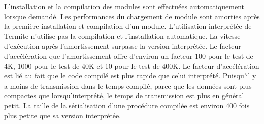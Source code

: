 L'installation et la compilation des modules sont effectuées automatiquement
lorsque demandé.  Les performances du chargement de module sont amorties après
la première installation et compilation d'un module. L'utilisation interprétée
de Termite n'utilise pas la compilation et l'installation automatique.  La
vitesse d'exécution après l'amortissement surpasse la version interprétée.  Le
facteur d'accélération que l'amortissement offre d'environ un facteur 100 pour
le test de 4K, 1000 pour le test de 40K et 10 pour le test de 400K.  Le facteur
d'accélération est lié au fait que le code compilé est plus rapide que celui
interprété.  Puisqu'il y a moins de transmission dans le temps compilé, parce
que les données sont plus compactes que lorsqu'interprété, le temps de
transmission est plus en général petit. La taille de la sérialisation d'une
procédure compilée est environ 400 fois plus petite que sa version interprétée.


